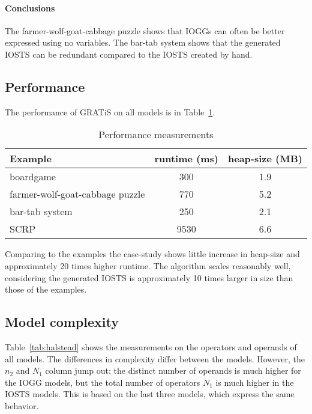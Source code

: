 \paragraph*{Conclusions}
The farmer-wolf-goat-cabbage puzzle shows that IOGGs can often be better expressed using no variables. The bar-tab system shows that the generated IOSTS can be redundant compared to the IOSTS created by hand.

\subsection{Performance}
The performance of GRATiS on all models is in Table~\ref{tab:performance}.

\begin{table}[ht]
\begin{center}
\begin{tabular}{|l|c|c|}
\hline
\textbf{Example} & \textbf{runtime (ms)} & \textbf{heap-size (MB)} \\ \hline
boardgame & 300 & 1.9 \\ \hline
farmer-wolf-goat-cabbage puzzle & 770 & 5.2 \\ \hline
bar-tab system & 250 & 2.1 \\ \hline
SCRP & 9530 & 6.6 \\ \hline
\end{tabular}
\end{center}
\caption{Performance measurements}
\label{tab:performance}
\end{table}

Comparing to the examples the case-study shows little increase in heap-size and approximately 20 times higher runtime. The algorithm scales reasonably well, considering the generated IOSTS is approximately 10 times larger in size than those of the examples.

\subsection{Model complexity}
Table~\ref{tab:halstead} shows the measurements on the operators and operands of all models.  The differences in complexity differ between the models. However, the $n_2$ and $N_1$ column jump out: the distinct number of operands is much higher for the IOGG models, but the total number of operators $N_1$ is much higher in the IOSTS models. This is based on the last three models, which express the same behavior.

